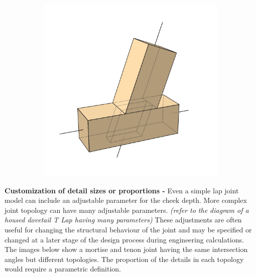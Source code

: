 \documentclass[11pt]{book}
\begin{document}
\begin{figure}[H]
\begin{subfigure}[b]{0.18\textwidth}
\end{subfigure}
\hfill
\begin{subfigure}[b]{0.18\textwidth}
\centering
\includegraphics[width=\textwidth]{./images/image11.jpg}
\end{subfigure}
\end{figure}


\textbf{Customization of detail sizes or proportions - }Even a simple lap joint model can include an adjustable parameter for the cheek depth. More complex joint topology can have many adjustable parameters. \textit{(refer to the diagram of a housed dovetail T Lap having many parameters) }These adjustments are often useful for changing the structural behaviour of the joint and may be specified or changed at a later stage of the design process during engineering calculations. The images below show a mortise and tenon joint having the same intersection angles but different topologies. The proportion of the details in each topology would require a parametric definition.
\end{document}

